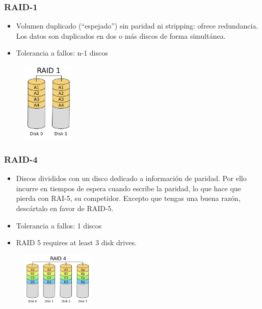 \documentclass{beamer}
\begin{document}
\begin{frame}
  \frametitle{RAID-1}

  \begin{itemize}
    \item Volumen duplicado (``espejado'') sin paridad ni stripping: ofrece redundancia. Los datos son duplicados en dos o más discos de forma simultánea.
    \item Tolerancia a fallos: n-1 discos
  \end{itemize}

\begin{figure}[h]
\begin{center}
  \includegraphics[width=2.5cm]{figs/RAID_1.png}
\end{center}
\end{figure}

\end{frame}

\begin{frame}
  \frametitle{RAID-4}

  \begin{itemize}
    \item Discos divididos con un disco dedicado a información de paridad. Por ello incurre en tiempos de espera cuando escribe la paridad, lo que hace que pierda con RAI-5, su competidor. Excepto que tengas una buena razón, descártalo en favor de RAID-5.
    \item Tolerancia a fallos: 1 discos
    \item RAID 5 requires at least 3 disk drives.
  \end{itemize}

\begin{figure}[h]
\begin{center}
  \includegraphics[width=3.5cm]{figs/RAID_4.png}
\end{center}
\end{figure}

\end{frame}
\end{document}
